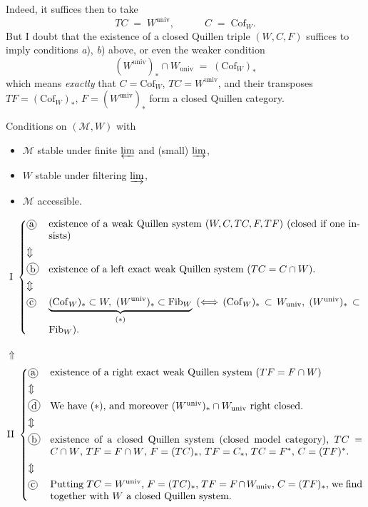 \documentclass[11pt]{article}
\newcommand{\printedpage}[1]{\marginpar{\footnotesize p.~#1}}
\newcommand{\msp}[1]{\marginpar{\footnotesize [#1]}}
\newcommand{\univ}{\mathrm{univ}}
\newcommand{\Cof}{\mathrm{Cof}}
\newcommand{\Fib}{\mathrm{Fib}}
\newcommand{\cercle}[1]{\mbox{\tikz[baseline=(c.base)]\node[draw,circle,inner sep=1pt](c){#1};}}
\begin{document}
\noindent Indeed, it suffices then to take
\[
TC \;=\; W^{\univ}, \qquad\quad C \;=\; \Cof_W .
\]
But I doubt that the existence of a closed Quillen triple $(W, C, F)$ suffices to imply conditions \textit{a}), \textit{b}) above, or even the weaker condition
\[
(W^{\univ})_* \cap W_{\univ} \;=\; (\Cof_W)_*
\]
which means \textit{exactly} that $C = \Cof_W$, $TC = W^{\univ}$, and their transposes $TF = (\Cof_W)_*$, $F = (W^{\univ})_*$ form a closed Quillen category.

\clearpage
\printedpage{15}

\msp{page 26}
\noindent Conditions on $(\mathcal{M}, W)$ with
\begin{itemize}[leftmargin=3em]
\item[\textit{a})] $\mathcal{M}$ stable under finite $\varprojlim$ and (small) $\varinjlim$,
\item[\textit{b})] $W$ stable under filtering $\varinjlim$,
\item[\textit{c})] $\mathcal{M}$ accessible.
\end{itemize}

\[
\mathrm{I}\ \left\{
\begin{array}{@{}l@{\quad}p{11cm}@{}}
\cercle{a} & existence of a weak Quillen system $(W, C, TC, F, TF)$ (closed if one insists) \\[1ex]
\Updownarrow & \\[1ex]
\cercle{b} & existence of a left exact weak Quillen system ($TC = C \cap W$). \\[1ex]
\Updownarrow & \\[1ex]
\cercle{c} & $\underbrace{(\Cof_W)_* \subset W,\ (W^{\univ})_* \subset \Fib_W}_{(*)}$ ($\Longleftrightarrow$ $(\Cof_W)_* \subset W_{\univ}$, $(W^{\univ})_* \subset \Fib_W$).
\end{array}\right.
\]

\noindent$\Uparrow$
\[
\mathrm{II}\ \left\{
\begin{array}{@{}l@{\quad}p{11cm}@{}}
\cercle{a} & existence of a right exact weak Quillen system ($TF = F \cap W$) \\[1ex]
\Updownarrow & \\[1ex]
\cercle{d} & We have $(*)$, and moreover $(W^{\univ})_* \cap W_{\univ}$ right closed. \\[1ex]
\Updownarrow & \\[1ex]
\cercle{b} & existence of a closed Quillen system (closed model category), $TC = C \cap W$, $TF = F \cap W$, $F = (TC)_*$, $TF = C_*$, $TC = F^*$, $C = (TF)^*$. \\[1ex]
\Updownarrow & \\[1ex]
\cercle{c} & Putting $TC = W^{\univ}$, $F = (TC)_*$, $TF = F \cap W_{\univ}$, $C = (TF)_*$, we find together with $W$ a closed Quillen system. %
\end{array}\right.
\]
\end{document}
